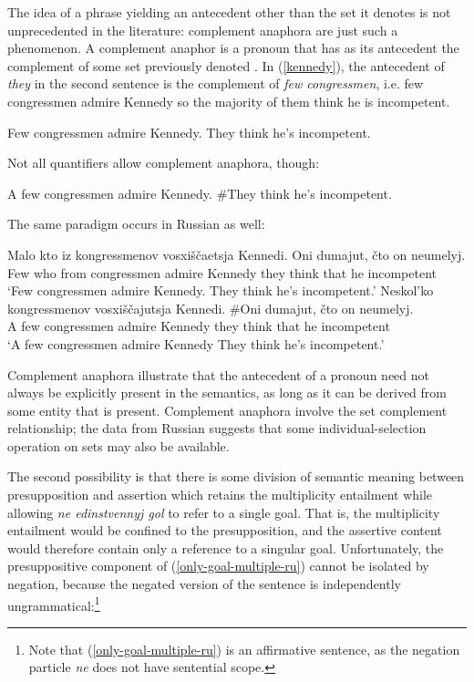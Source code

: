 The idea of a phrase yielding an antecedent other than the set it denotes is not unprecedented in the literature: complement anaphora are just such a phenomenon. A complement anaphor is a pronoun that has as its antecedent the complement of some set previously denoted \citep{nouwen03, schwarz09}. In (\ref{kennedy}), the antecedent of \textit{they} in the second sentence is the complement of \textit{few congressmen}, i.e. few congressmen admire Kennedy so the majority of them think he is incompetent.

\begin{exe}
	\ex \label{kennedy} Few congressmen admire Kennedy. They think he's incompetent.
\end{exe}

Not all quantifiers allow complement anaphora, though:

\begin{exe}
	\ex A few congressmen admire Kennedy. \#They think he's incompetent.
\end{exe}

The same paradigm occurs in Russian as well:

\begin{exe}
	\ex \gll Malo kto iz kongressmenov vosxi\v{s}\v{c}aetsja Kennedi. Oni dumajut, \v{c}to on neumelyj.\\
	Few who from congressmen admire Kennedy they think that he incompetent\\
	\glt `Few congressmen admire Kennedy. They think he's incompetent.'
	\ex \gll Neskol'ko kongressmenov vosxi\v{s}\v{c}ajutsja Kennedi. \#Oni dumajut, \v{c}to on neumelyj.\\
	{A few} congressmen admire Kennedy they think that he incompetent\\
	\glt `A few congressmen admire Kennedy They think he's incompetent.'
\end{exe}

Complement anaphora illustrate that the antecedent of a pronoun need not always be explicitly present in the semantics, as long as it can be derived from some entity that is present. Complement anaphora involve the set complement relationship; the data from Russian suggests that some individual-selection operation on sets may also be available.

The second possibility is that there is some division of semantic meaning between presupposition and assertion which retains the multiplicity entailment while allowing \textit{ne edinstvennyj gol} to refer to a single goal. That is, the multiplicity entailment would be confined to the presupposition, and the assertive content would therefore contain only a reference to a singular goal. Unfortunately, the presuppositive component of (\ref{only-goal-multiple-ru}) cannot be isolated by negation, because the negated version of the sentence is independently ungrammatical:\footnote{Note that (\ref{only-goal-multiple-ru}) is an affirmative sentence, as the negation particle \textit{ne} does not have sentential scope.}


